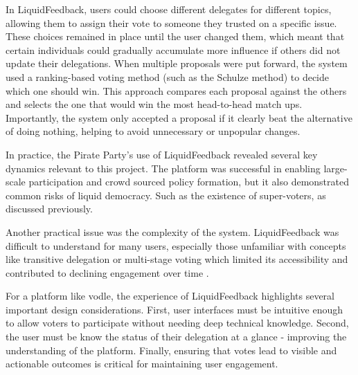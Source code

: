 In LiquidFeedback, users could choose different delegates for different topics, allowing them to assign their vote to someone they trusted on a specific issue. These choices remained in place until the user changed them, which meant that certain individuals could gradually accumulate more influence if others did not update their delegations. When multiple proposals were put forward, the system used a ranking-based voting method (such as the Schulze method) to decide which one should win. This approach compares each proposal against the others and selects the one that would win the most head-to-head match ups. Importantly, the system only accepted a proposal if it clearly beat the alternative of doing nothing, helping to avoid unnecessary or unpopular changes.

In practice, the Pirate Party's use of LiquidFeedback revealed several key dynamics relevant to this project. The platform was successful in enabling large-scale participation and crowd sourced policy formation, but it also demonstrated common risks of liquid democracy. Such as the existence of super-voters, as discussed previously.

Another practical issue was the complexity of the system. LiquidFeedback was difficult to understand for many users, especially those unfamiliar with concepts like transitive delegation or multi-stage voting which limited its accessibility and contributed to declining engagement over time \citep{kling2015votingbehaviourpoweronline}.

For a platform like vodle, the experience of LiquidFeedback highlights several important design considerations. First, user interfaces must be intuitive enough to allow voters to participate without needing deep technical knowledge. Second, the user must be know the status of their delegation at a glance - improving the understanding of the platform. Finally, ensuring that votes lead to visible and actionable outcomes is critical for maintaining user engagement.

